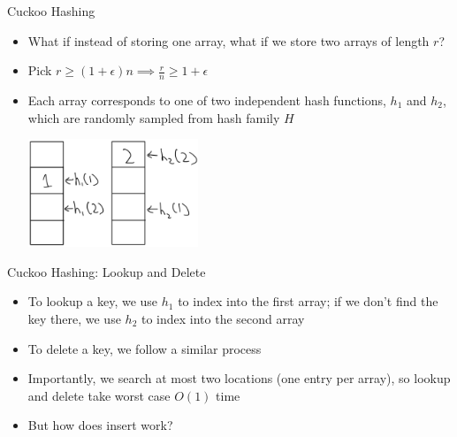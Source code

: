 \documentclass[aspectratio=169]{beamer}
\begin{document}
\begin{frame}{Cuckoo Hashing}
    \begin{itemize}
        \item What if instead of storing one array, what if we store two arrays of length $r$? \pause
        \item Pick $r \ge (1 + \epsilon) n \implies \frac r n \ge 1 + \epsilon$
        \item Each array corresponds to one of two independent hash functions, $h_1$ and $h_2$, which are randomly sampled from hash family $H$
        \begin{center}
            \includegraphics[width=0.4\textwidth]{images/cuckoo.png}
        \end{center}
    \end{itemize}
\end{frame}

\begin{frame}{Cuckoo Hashing: Lookup and Delete}
    \begin{itemize}
        \item To lookup a key, we use $h_1$ to index into the first array; if we don't find the key there, we use $h_2$ to index into the second array
        \item To delete a key, we follow a similar process \pause
        \item Importantly, we search at most two locations (one entry per array), so lookup and delete take worst case $O(1)$ time \pause
        \item But how does insert work?
    \end{itemize}
\end{frame}
\end{document}
